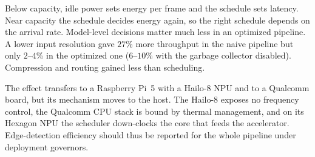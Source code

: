 Below capacity, idle power sets energy per frame and the schedule sets
latency. Near capacity the schedule decides energy again, so
the right schedule depends on the arrival rate. Model-level decisions
matter much less in an optimized pipeline. A lower input resolution gave
$27$\% more throughput in the naive pipeline but only $2$--$4$\% in the
optimized one ($6$--$10$\% with the garbage collector disabled).
Compression and routing gained less than scheduling.

The effect transfers to a Raspberry Pi~5 with a Hailo-8 NPU and to a
Qualcomm board, but its mechanism moves to the host. The Hailo-8
exposes no frequency control, the Qualcomm CPU stack is bound by thermal
management, and on its Hexagon NPU the scheduler down-clocks the core
that feeds the accelerator. Edge-detection efficiency should thus
be reported for the whole pipeline under deployment governors.
